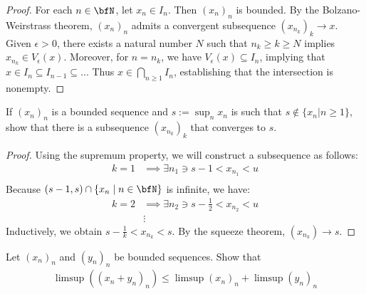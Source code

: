 \documentclass[10pt,twoside,openany]{memoir}
\begin{document}
        \begin{proof}
            For each $n \in \bfN$, let $x_n \in I_n$. Then $(x_n)_n$ is bounded. By the Bolzano-Weirstrass theorem, $(x_n)_n$ admits a convergent subsequence $(x_{n_k})_k \rightarrow x$. Given $\epsilon > 0$, there exists a natural number $N$ such that $n_k \geq k \geq N$ implies $x_{n_k} \in V_\epsilon(x)$. Moreover, for $n = n_k$, we have $V_\epsilon(x) \subseteq I_n$, implying that $x\in I_n \subseteq I_{n-1} \subseteq ...$ Thus $x \in \bigcap_{n\geq 1}I_n$, establishing that the intersection is nonempty.
        \end{proof}
    \begin{exercise}
        If $(x_n)_n$ is a bounded sequence and $s:=\sup_n x_n$ is such that $s \not\in \{x_n | n\geq 1\}$, show that there is a subsequence $(x_{n_k})_k$ that converges to $s$.
    \end{exercise}
        \begin{proof}
            Using the supremum property, we will construct a subsequence as follows:
                \begin{equation*}
                \begin{split}
                   k = 1 &\implies \exists n_1 \ni  s-1 < x_{n_1} < u \\                  
                \end{split}
                \end{equation*}
            Because $(s-1,s)\cap \{x_n \mid n \in \bfN\}$ is infinite, we have:
                \begin{equation*}
                \begin{split}
                   k = 2 &\implies \exists n_2 \ni  s-\frac{1}{2} < x_{n_2} < u \\
                   &\vdots
                \end{split}
                \end{equation*}
            Inductively, we obtain $s - \frac{1}{k} < x_{n_k} < s$. By the squeeze theorem, $(x_{n_k}) \rightarrow s$. 
        \end{proof}
    \begin{exercise}
        Let $(x_n)_n$ and $(y_n)_n$ be bounded sequences. Show that
            \begin{equation*}
            \begin{split}
                \limsup((x_n + y_n)_n) \leq \limsup(x_n)_n + \limsup(y_n)_n
            \end{split}
            \end{equation*}
    \end{exercise}
\end{document}
